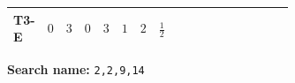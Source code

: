 \documentclass[8pt]{article}
\begin{document}
\begin{landscape}
\begin{longtable}{@{}llcccccc >{\raggedright\arraybackslash}p{0.21\linewidth} >{\raggedright\arraybackslash}p{0.21\linewidth} >{\raggedright\arraybackslash}p{0.21\linewidth}@{}}
T3-E & $0$ & $3$ & $0$ & $3$ & $1$ & $2$ & $\frac{1}{2}$ & \scriptsize\adjustbox{max width=\linewidth}{$\begin{gathered} - \frac{11 \sqrt{3} g_{2}^{2} \overline{y_{1}} \overline{y_{2}}}{8 MF}\end{gathered}$} & \scriptsize\adjustbox{max width=\linewidth}{$\begin{gathered} - \frac{3 \sqrt{11} lambda12Inv2 \overline{y_{1}} \overline{y_{2}}}{22 MF}\end{gathered}$} & \scriptsize\adjustbox{max width=\linewidth}{$\begin{gathered} - \frac{\sqrt{3} g_{1}^{2} \overline{y_{1}} \overline{y_{2}}}{8 MF}\end{gathered}$} \\
\midrule
\bottomrule
\end{longtable}
\clearpage
\noindent\textbf{Search name: }\texttt{2,2,9,14}\par\smallskip

\end{landscape}
\end{document}
